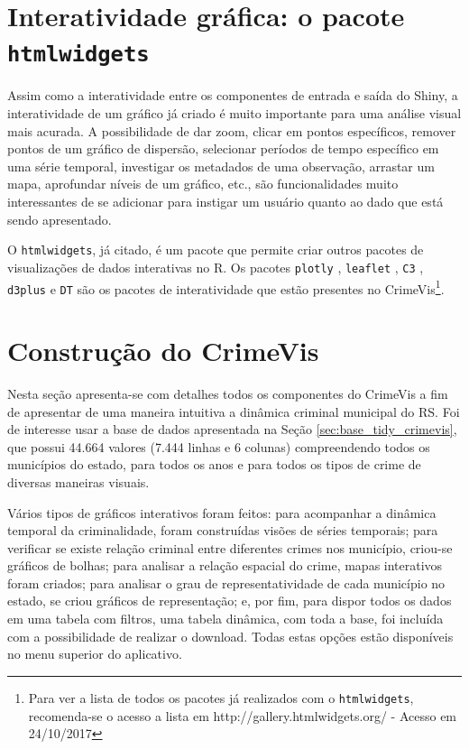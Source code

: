 \documentclass[12pt,openright,oneside,a4paper,english,french,spanish]{abntex2}
\numberwithin{table}{section} %
\numberwithin{figure}{section} %
\begin{document}
\section{Interatividade gráfica: o pacote \texttt{htmlwidgets}\label{sec:htmlwidgets}}

Assim como a interatividade entre os componentes de entrada e saída do Shiny, a interatividade de um gráfico já criado é muito importante para uma análise visual mais acurada. A possibilidade de dar zoom, clicar em pontos específicos, remover pontos de um gráfico de dispersão, selecionar períodos de tempo específico em uma série temporal, investigar os metadados de uma observação, arrastar um mapa, aprofundar níveis de um gráfico, etc., são funcionalidades muito interessantes de se adicionar para instigar um usuário quanto ao dado que está sendo apresentado.

O \texttt{htmlwidgets}, já citado, é um pacote que permite criar outros pacotes de visualizações de dados interativas no R. Os pacotes \texttt{plotly} \cite{plotly}, \texttt{leaflet} \cite{leaflet}, \texttt{C3} \cite{c3}, \texttt{d3plus} \cite{d3plus} e \texttt{DT} \cite{DT} são os pacotes de interatividade que estão presentes no CrimeVis\footnote{Para ver a lista de todos os pacotes já realizados com o \texttt{htmlwidgets}, recomenda-se o acesso a lista em http://gallery.htmlwidgets.org/ - Acesso em 24/10/2017}.




\section{Construção do CrimeVis\label{sec:construcao_crimevis}}

Nesta seção apresenta-se com detalhes todos os componentes do CrimeVis a fim de apresentar de uma maneira intuitiva a dinâmica criminal municipal do RS. Foi de interesse usar a base de dados apresentada na Seção \ref{sec:base_tidy_crimevis}, que possui 44.664 valores (7.444 linhas e 6 colunas) compreendendo todos os municípios do estado, para todos os anos e para todos os tipos de crime de diversas maneiras visuais.

Vários tipos de gráficos interativos foram feitos: para acompanhar a dinâmica temporal da criminalidade, foram construídas visões de séries temporais; para verificar se existe relação criminal entre diferentes crimes nos município, criou-se gráficos de bolhas; para analisar a relação espacial do crime, mapas interativos foram criados; para analisar o grau de representatividade de cada município no estado, se criou gráficos de representação; e, por fim, para dispor todos os dados em uma tabela com filtros, uma tabela dinâmica, com toda a base, foi incluída com a possibilidade de realizar o download. Todas estas opções estão disponíveis no menu superior do aplicativo.
\end{document}
